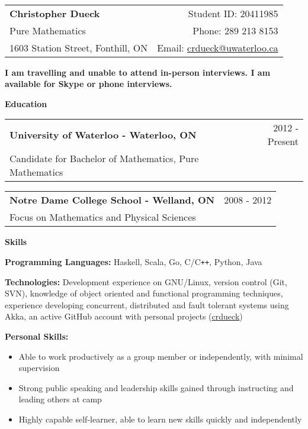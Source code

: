 \documentclass[10pt]{article}
\makeatletter
\newcommand{\resheader}[6]{\
\begin{tabular*}{7in}{l@{\extracolsep{\fill}}r}
    \textbf{\huge #1} & {\large #2} \vspace{4pt}\\
    {\large #3} & {\large #4} \vspace{4pt}\\
    {\large #5} & {\large #6}
\end{tabular*}\vspace{4pt}}
\newcommand{\resheading}[1]{{\large \colorbox{headercol}{\begin{minipage}{\textwidth}{\textbf{#1 \vphantom{p\^{E}}}}\end{minipage}}}}
\newcommand{\ressubheading}[3]{\item
\begin{tabular*}{7in}{l@{\extracolsep{\fill}}r}
    \textbf{#1} & #2 \\ #3
\end{tabular*}\vspace{-4pt}}
\newcommand{\resitem}[2]{\item{\textbf{#1} #2}}
\makeatother
\begin{document}
\resheader{Christopher Dueck} {Student ID: 20411985}
{Pure Mathematics} {Phone: 289 213 8153}
{1603 Station Street, Fonthill, ON} {Email: \href{mailto:crdueck@uwaterloo.ca}{crdueck@uwaterloo.ca}}

\resheading{I am travelling and unable to attend in-person interviews. I am available for Skype or phone interviews.}

\resheading{Education}
\begin{description}
    \ressubheading{University of Waterloo - Waterloo, ON} {2012 - Present} {Candidate for Bachelor of Mathematics, Pure Mathematics}
    \ressubheading{Notre Dame College School - Welland, ON} {2008 - 2012} {Focus on Mathematics and Physical Sciences}
\end{description}

\resheading{Skills}
\begin{description}
    \resitem{Programming Languages:} {Haskell, Scala, Go, C/C\texttt{++}, Python, Java}
    \resitem{Technologies:} {Development experience on GNU/Linux, version control (Git, SVN), knowledge of object oriented and functional programming techniques, experience developing concurrent, distributed and fault tolerant systems using Akka, an active GitHub account with personal projects (\href{https://github.com/crdueck}{crdueck})}
    \resitem{Personal Skills:}{\vspace{-4pt}
    \begin{itemize}
        \item{Able to work productively as a group member or independently, with minimal supervision}
        \item{Strong public speaking and leadership skills gained through instructing and leading others at camp}
        \item{Highly capable self-learner, able to learn new skills quickly and independently}
    \end{itemize}}
\end{description}
\end{document}
